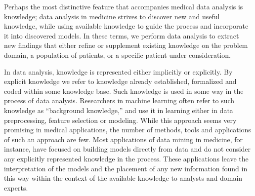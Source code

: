 \documentclass[10pt,a4paper]{article}
\begin{document}
	Perhaps the most distinctive feature that accompanies medical data analysis is knowledge; data analysis in medicine strives to discover new and useful knowledge, while using available knowledge to guide the process and incorporate it into discovered models. In these terms, we perform data analysis to extract new findings that either refine or supplement existing knowledge on the problem domain, a population of patients, or a specific patient under consideration. \cite{zupan2006knowledge}
	
	In data analysis, knowledge is represented either implicitly or explicitly. By explicit knowledge we refer to knowledge already established, formalized and coded within some knowledge base. Such knowledge is used in some way in the process of data analysis. Researchers in machine learning often refer to such knowledge as “background knowledge,” and use it in learning either in data preprocessing, feature selection or modeling. While this approach seems very promising in medical applications, the number of methods, tools and applications of such an approach are few. Most applications of data mining in medicine, for instance, have focused on building models directly from data and do not consider any explicitly represented knowledge in the process. These applications leave the interpretation of the models and the placement of any new information found in this way within the context of the available knowledge to analysts and domain experts. \cite{zupan2006knowledge}
	
\end{document}
